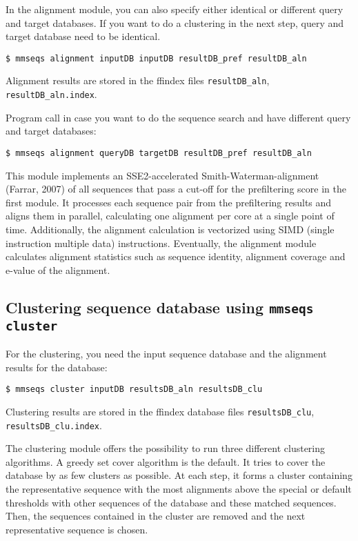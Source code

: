 \documentclass[11pt,a4paper]{report}
\begin{document}
In the alignment module, you can also specify either identical or
different query and target databases. If you want to do a clustering
in the next step, query and target database need to be identical.

\texttt{\$ mmseqs alignment inputDB inputDB resultDB\_pref resultDB\_aln }

Alignment results are stored in the ffindex files \texttt{resultDB\_aln},
\texttt{resultDB\_aln.index}.

Program call in case you want to do the sequence search and have different
query and target databases:

\texttt{\$ mmseqs alignment queryDB targetDB resultDB\_pref resultDB\_aln }

This module implements an SSE2-accelerated Smith-Waterman-alignment
(Farrar, 2007) of all sequences that pass a cut-off for the prefiltering
score in the first module. It processes each sequence pair from the
prefiltering results and aligns them in parallel, calculating one
alignment per core at a single point of time. Additionally, the alignment
calculation is vectorized using SIMD (single instruction multiple
data) instructions. Eventually, the alignment module calculates alignment
statistics such as sequence identity, alignment coverage and e-value
of the alignment.


\subsection{Clustering sequence database using \texttt{mmseqs cluster}\label{sub:Clustering_module}}

For the clustering, you need the input sequence database and the alignment
results for the database:

\texttt{\$ mmseqs cluster inputDB resultsDB\_aln resultsDB\_clu}

Clustering results are stored in the ffindex database files \texttt{resultsDB\_clu},
\texttt{resultsDB\_clu.index}.

The clustering module offers the possibility to run three different
clustering algorithms. A greedy set cover algorithm is the default.
It tries to cover the database by as few clusters as possible. At
each step, it forms a cluster containing the representative sequence
with the most alignments above the special or default thresholds with
other sequences of the database and these matched sequences. Then,
the sequences contained in the cluster are removed and the next representative
sequence is chosen.
\end{document}
